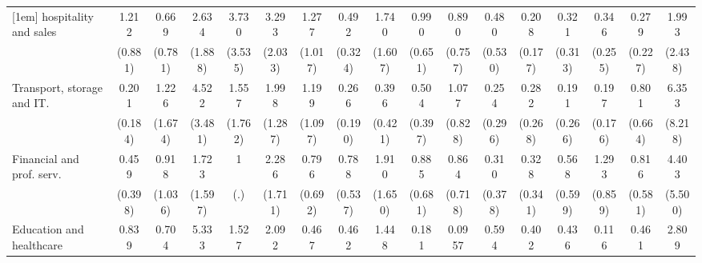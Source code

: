 {\begin{tabular}{l*{16}{c}}
[1em]
hospitality and sales&       1.212         &       0.669         &       2.634         &       3.730         &       3.293         &       1.277         &       0.492         &       1.740         &       0.990         &       0.890         &       0.480         &       0.208         &       0.321         &       0.346         &       0.279         &       1.993         \\
                    &     (0.881)         &     (0.781)         &     (1.888)         &     (3.535)         &     (2.033)         &     (1.017)         &     (0.324)         &     (1.607)         &     (0.651)         &     (0.757)         &     (0.530)         &     (0.177)         &     (0.313)         &     (0.255)         &     (0.227)         &     (2.438)         \\
[1em]
Transport, storage and IT.&       0.201         &       1.226         &       4.522\sym{*}  &       1.557         &       1.998         &       1.199         &       0.266         &       0.396         &       0.504         &       1.077         &       0.254         &       0.282         &       0.191         &       0.197         &       0.801         &       6.353         \\
                    &     (0.184)         &     (1.674)         &     (3.481)         &     (1.762)         &     (1.287)         &     (1.097)         &     (0.190)         &     (0.421)         &     (0.397)         &     (0.828)         &     (0.296)         &     (0.268)         &     (0.266)         &     (0.176)         &     (0.664)         &     (8.218)         \\
[1em]
Financial and prof. serv.&       0.459         &       0.918         &       1.723         &           1         &       2.286         &       0.796         &       0.788         &       1.910         &       0.885         &       0.864         &       0.310         &       0.328         &       0.568         &       1.293         &       0.816         &       4.403         \\
                    &     (0.398)         &     (1.036)         &     (1.597)         &         (.)         &     (1.711)         &     (0.692)         &     (0.537)         &     (1.650)         &     (0.681)         &     (0.718)         &     (0.378)         &     (0.341)         &     (0.599)         &     (0.859)         &     (0.581)         &     (5.500)         \\
[1em]
Education and healthcare&       0.839         &       0.704         &       5.333\sym{*}  &       1.527         &       2.092         &       0.467         &       0.462         &       1.448         &       0.181         &      0.0957\sym{*}  &       0.594         &       0.402         &       0.436         &       0.116\sym{*}  &       0.461         &       2.809         \\

\end{tabular}}
